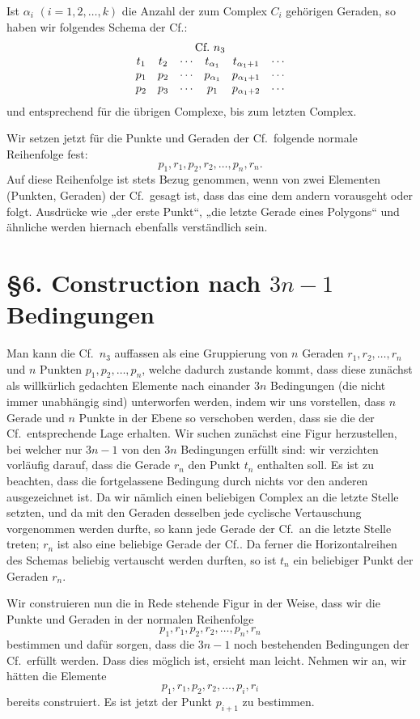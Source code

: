 \documentclass[11pt]{article}
\newcommand{\Cf}{\textup{Cf.}}
\begin{document}
Ist $\alpha_i$ $(i=1,2,\ldots,k)$ die Anzahl der zum Complex $C_i$ gehörigen Geraden, so haben wir folgendes Schema der \Cf:
\[
\begin{array}{cccccc}
\multicolumn{6}{c}{\Cf\ n_3}\\
t_1&t_2&\cdots&t_{\alpha_1}&t_{\alpha_1+1}&\cdots\\
p_1&p_2&\cdots&p_{\alpha_1}&p_{\alpha_1+1}&\cdots\\
p_2&p_3&\cdots&p_1&p_{\alpha_1+2}&\cdots
\end{array}
\]
und entsprechend für die übrigen Complexe, bis zum letzten Complex.

Wir setzen jetzt für die Punkte und Geraden der \Cf\ folgende normale Reihenfolge fest:
\[
p_1,r_1,p_2,r_2,\ldots,p_n,r_n.
\]
Auf diese Reihenfolge ist stets Bezug genommen, wenn von zwei Elementen (Punkten, Geraden) der \Cf\ gesagt ist, dass das eine dem andern vorausgeht oder folgt. Ausdrücke wie „der erste Punkt“, „die letzte Gerade eines Polygons“ und ähnliche werden hiernach ebenfalls verständlich sein.

\section*{\S 6. Construction nach $3n-1$ Bedingungen}
Man kann die \Cf\ $n_3$ auffassen als eine Gruppierung von $n$ Geraden $r_1,r_2,\ldots,r_n$ und $n$ Punkten $p_1,p_2,\ldots,p_n$, welche dadurch zustande kommt, dass diese zunächst als willkürlich gedachten Elemente nach einander $3n$ Bedingungen (die nicht immer unabhängig sind) unterworfen werden, indem wir uns vorstellen, dass $n$ Gerade und $n$ Punkte in der Ebene so verschoben werden, dass sie die der \Cf\ entsprechende Lage erhalten. Wir suchen zunächst eine Figur herzustellen, bei welcher nur $3n-1$ von den $3n$ Bedingungen erfüllt sind: wir verzichten vorläufig darauf, dass die Gerade $r_n$ den Punkt $t_n$ enthalten soll. Es ist zu beachten, dass die fortgelassene Bedingung durch nichts vor den anderen ausgezeichnet ist. Da wir nämlich einen beliebigen Complex an die letzte Stelle setzten, und da mit den Geraden desselben jede cyclische Vertauschung vorgenommen werden durfte, so kann jede Gerade der \Cf\ an die letzte Stelle treten; $r_n$ ist also eine beliebige Gerade der \Cf. Da ferner die Horizontalreihen des Schemas beliebig vertauscht werden durften, so ist $t_n$ ein beliebiger Punkt der Geraden $r_n$.

Wir construieren nun die in Rede stehende Figur in der Weise, dass wir die Punkte und Geraden in der normalen Reihenfolge
\[
p_1,r_1,p_2,r_2,\ldots,p_n,r_n
\]
bestimmen und dafür sorgen, dass die $3n-1$ noch bestehenden Bedingungen der \Cf\ erfüllt werden. Dass dies möglich ist, ersieht man leicht. Nehmen wir an, wir hätten die Elemente
\[
p_1,r_1,p_2,r_2,\ldots,p_i,r_i
\]
bereits construiert. Es ist jetzt der Punkt $p_{i+1}$ zu bestimmen.
\end{document}
